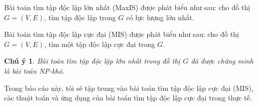 \documentclass[14pt, oneside, a4paper, openany]{scrartcl}
\newtheorem*{remark}{Chú ý}
\begin{document}
Bài toán tìm tập độc lập lớn nhất  (MaxIS) được phát biểu như sau: cho đồ thị $G = (V,E)$, tìm tập độc lập trong $G$ có lực lượng lớn nhất.

Bài toán tìm tập độc lập cực đại  (MIS) được phát biểu như sau: cho đồ thị $G = (V,E)$, tìm một tập độc lập cực đại trong $G$.


\begin{remark}
\cite{yannakakis01} Bài toán tìm tập độc lập lớn nhất trong đồ thị $G$ đã được chứng minh là bài toán NP-khó.
\end{remark}

Trong báo cáo này, tôi sẽ tập trung vào bài toán tìm tập độc lập cực đại (MIS), các thuật toán và ứng dụng của bài toán tìm tập độc lập cực đại trong thực tế. 
\end{document}
